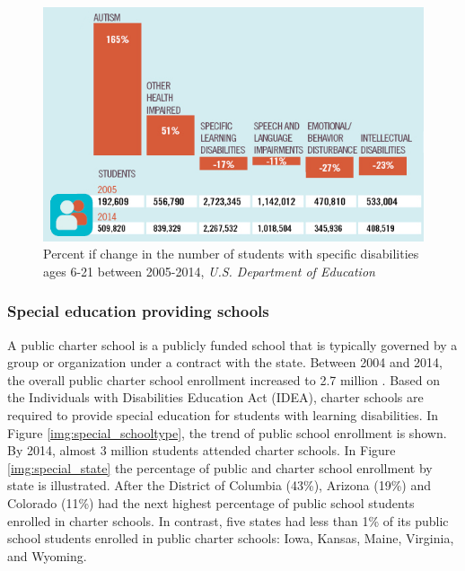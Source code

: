 \documentclass[letterpaper,10pt]{article}
\begin{document}
\begin{figure}[hbt!]
\centering
\includegraphics[scale=0.5]{kinds.png}
\caption[Percent if change in the number of students with specific disabilities]{Percent if change in the number of students with specific disabilities ages 6-21 between 2005-2014, \textit{U.S. Department of Education} }
\label{img:special_kind}
\end{figure}


\subsubsection{Special education providing schools}

A public charter school is a publicly funded school that is typically governed by a group or organization under a contract with the state. Between 2004 and 2014, the overall public charter school enrollment increased to 2.7 million . Based on the Individuals with Disabilities Education Act (IDEA), charter schools are required to provide special education for students with learning disabilities. In Figure \ref{img:special_schooltype}, the trend of public school enrollment is shown. By 2014, almost 3 million students attended charter schools. In Figure \ref{img:special_state} the percentage of public and charter school enrollment by state is illustrated.  After the District of Columbia (43\%), Arizona (19\%) and Colorado (11\%) had the next highest percentage of public school students enrolled in charter schools. In contrast, five states had less than 1\% of its public school students enrolled in public charter schools: Iowa, Kansas, Maine, Virginia, and Wyoming. \cite{spec_enroll}
\end{document}
